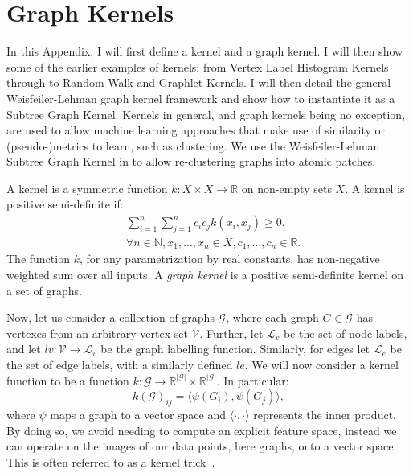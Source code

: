 \chapter{Graph Kernels}
\label{appendix:graph_kernels}

In this Appendix, I will first define a kernel and a graph kernel. I will then
show some of the earlier examples of kernels: from Vertex Label Histogram
Kernels through to Random-Walk and Graphlet Kernels. I will then detail the
general Weisfeiler-Lehman graph kernel framework and show how to instantiate it
as a Subtree Graph Kernel. Kernels in general, and graph kernels being no
exception, are used to allow machine learning approaches that make use of
similarity or (pseudo-)metrics to learn, such as clustering. We use the
Weisfeiler-Lehman Subtree Graph Kernel in  to allow
re-clustering \deltaPDGN graphs into atomic patches.

A kernel is a symmetric function $k: X \times X \rightarrow \mathbb{R}$ on
non-empty sets $X$. A kernel is positive semi-definite if:
\begin{align*}
	&\sum_{i=1}^{n} \sum_{j=1}^{n} c_i c_j k(x_i, x_j) \geq 0, \\
	&\forall n \in \mathbb{N}, x_1, \ldots, x_n \in X, c_1, \ldots, c_n \in \mathbb{R}. 
\end{align*}
The function $k$, for any
parametrization by real constants, has non-negative weighted sum over all
inputs. A \emph{graph kernel} is a positive semi-definite kernel on a set of graphs.

Now, let us consider a collection of graphs $\mathcal{G}$, where each graph $G
\in \mathcal{G}$ has vertexes from an arbitrary vertex set $\mathcal{V}$.
Further, let $\mathcal{L}_v$ be the set of node labels, and let $lv:
\mathcal{V} \rightarrow \mathcal{L}_v$ be the graph labelling function.
Similarly, for edges let $\mathcal{L}_e$ be the set of edge labels, with a
similarly defined $le$. We will now consider a kernel function to be a function
$k: \mathcal{G} \rightarrow \mathbb{R}^{|\mathcal{G}|} \times
\mathbb{R}^{|\mathcal{G}|}$. In particular:
\begin{equation}
\label{eq:kernel_general}
    k(\mathcal{G})_{ij} = \langle\psi(G_i), \psi(G_j)\rangle,
\end{equation}
%
where $\psi$ maps a graph to a vector space and $\langle\cdot,\cdot\rangle$
represents the inner product. By doing so, we avoid needing to compute an
explicit feature space, instead we can operate on the images of our data points,
here graphs, onto a vector space. This is often referred to as a kernel
trick~\cite{theodoridis2008}.


